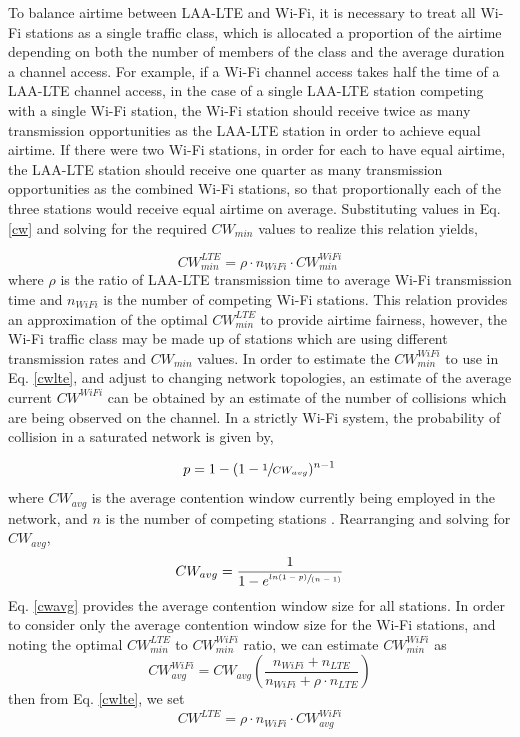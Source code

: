 To balance airtime between \mbox{LAA-LTE} and \mbox{Wi-Fi}, it is necessary to treat all \mbox{Wi-Fi} stations as a single traffic class, which is allocated a proportion of the airtime depending on both the number of members of the class and the average duration a channel access.  For example, if a \mbox{Wi-Fi} channel access takes half the time of a \mbox{LAA-LTE} channel access, in the case of a single \mbox{LAA-LTE} station competing with a single \mbox{Wi-Fi} station, the \mbox{Wi-Fi} station should receive twice as many transmission opportunities as the \mbox{LAA-LTE} station in order to achieve equal airtime.  If there were two \mbox{Wi-Fi} stations, in order for each to have equal airtime, the \mbox{LAA-LTE} station should receive one quarter as many transmission opportunities as the combined \mbox{Wi-Fi} stations, so that proportionally each of the three stations would receive equal airtime on average.  Substituting values in Eq. \ref{cw} and solving for the required $CW_{min}$ values to realize this relation yields,

\begin{equation}\label{cwlte}
CW^{LTE}_{min} = \rho\cdot n_{WiFi} \cdot{CW^{WiFi}_{min}}
\end{equation}
where $\rho$ is the ratio of \mbox{LAA-LTE} transmission time to average \mbox{Wi-Fi} transmission time and $n_{WiFi}$ is the number of competing \mbox{Wi-Fi} stations.  This relation provides an approximation of the optimal $CW^{LTE}_{min}$ to provide airtime fairness, however, the \mbox{Wi-Fi} traffic class may be made up of stations which are using different transmission rates and $CW_{min}$ values.  In order to estimate the $CW^{WiFi}_{min}$ to use in Eq. \ref{cwlte}, and adjust to changing network topologies, an estimate of the average current $CW^{WiFi}$ can be obtained by an estimate of the number of collisions which are being observed on the channel.  In a strictly \mbox{Wi-Fi} system, the probability of collision in a saturated network is given by, 

\begin{equation}\label{pcollision}
p = 1-(1-\sfrac{1}{CW_{avg}})^{n-1}
\end{equation}
where $CW_{avg}$ is the average contention window currently being employed in the network, and $n$ is the number of competing stations \cite{vu}.  Rearranging and solving for $CW_{avg}$,
\begin{equation}\label{cwavg}
CW_{avg} = \frac{1}{1-e^{ \sfrac{ln(1-p)}{(n-1)} }}
\end{equation}
Eq. \ref{cwavg} provides the average contention window size for all stations.  In order to consider only the average contention window size for the \mbox{Wi-Fi} stations, and noting the optimal $CW^{LTE}_{min}$ to $CW^{WiFi}_{min}$ ratio, we can estimate $CW^{WiFi}_{min}$ as
\begin{equation}\label{cwwifi}
CW^{WiFi}_{avg} = CW_{avg}\left ( \frac{n_{WiFi} + n_{LTE}}{n_{WiFi} + \rho\cdot n_{LTE}} \right )
\end{equation}
then from Eq. \ref{cwlte}, we set 
\begin{equation}\label{cwlteopt}
CW^{LTE} = \rho \cdot n_{WiFi} \cdot{CW^{WiFi}_{avg}}
\end{equation}

